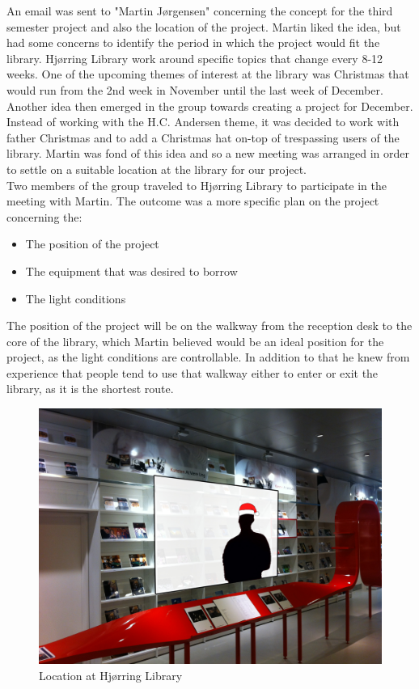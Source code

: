 An email was sent to "Martin Jørgensen" concerning the concept for the third semester project and also the location of the project. Martin liked the idea, but had some concerns to identify the period in which the project would fit the library. Hjørring Library work around specific topics that change every 8-12 weeks. One of the upcoming themes of interest at the library was Christmas that would run from the 2nd week in November until the last week of December. Another idea then emerged in the group towards creating a project for December. Instead of working with the H.C. Andersen theme, it was decided to work with father Christmas and to add a Christmas hat on-top of trespassing users of the library. Martin was fond of this idea and so a new meeting was arranged in order to settle on a suitable location at the library for our project.\\
Two members of the group traveled to Hjørring Library to participate in the meeting with Martin. The outcome was a more specific plan on the project concerning the:
\begin{itemize}
\item The position of the project
\item The equipment that was desired to borrow
\item The light conditions
\end{itemize}
The position of the project will be on the walkway from the reception desk to the core of the library, which Martin believed would be an ideal position for the project, as the light conditions are controllable. In addition to that he knew from experience that people tend to use that walkway either to enter or exit the library, as it is the shortest route.

\begin{figure}[htbp]
\centering
\includegraphics[width=1.00\textwidth]{Pictures/HjoerringLibrary/LocationJohannesHat.jpg}
\caption{Location at Hjørring Library}
\label{fig:Location at Hjørring Library}
\end{figure}

